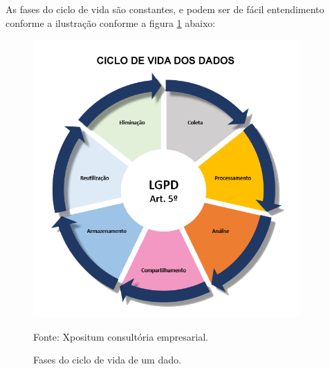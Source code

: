 \documentclass[
	12pt,				%
	openright,			%
	oneside,			%
	a4paper,			%
	english,			%
	french,				%
	spanish,			%
	brazil,				%
	]{abntex2}
\begin{document}
As fases do ciclo de vida são constantes, e podem ser de fácil entendimento conforme a ilustração conforme a figura \ref{fig: 01CicloDeVida} abaixo:

\begin{figure}[ht]
    \centering
    \caption{Fases do ciclo de vida de um dado.}
    \includegraphics[width=4.0in]{Images/01CicloDeVida.png}
    \label{fig: 01CicloDeVida}
    
    \centering \small Fonte: Xpositum consultória empresarial.
\end{figure}
\end{document}

